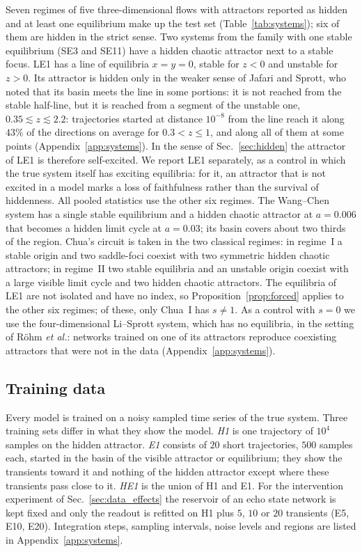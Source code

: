 \documentclass[aip,cha,reprint,amsmath,amssymb,longbibliography]{revtex4-2}
\theoremstyle{definition}
\begin{document}
Seven regimes of five three-dimensional flows with attractors reported as hidden and at least one equilibrium make up the
test set (Table~\ref{tab:systems}); six of them are hidden in the strict sense.\cite{Molaie2013,JafariSprott2013,WangChen2012,Leonov2011PLA,Stankevich2017} Two systems from
the family with one stable equilibrium (SE3 and SE11) have a hidden chaotic attractor next to a stable focus. LE1 has a line
of equilibria $x=y=0$, stable for $z<0$ and unstable for $z>0$. Its attractor is hidden only in the weaker sense of
Jafari and Sprott,\cite{JafariSprott2013} who noted that its basin meets the line in some portions: it is not reached from
the stable half-line, but it is reached from a segment of the unstable one, $0.35\lesssim z\lesssim2.2$: trajectories
started at distance $10^{-8}$ from the line reach it along $43\%$ of the directions on average for $0.3<z\le1$, and along
all of them at some points (Appendix~\ref{app:systems}).
In the sense of Sec.~\ref{sec:hidden} the attractor of LE1 is therefore self-excited. We report LE1 separately, as a
control in which the true system itself has exciting equilibria: for it, an attractor that is not excited in a model
marks a loss of faithfulness rather than the survival of hiddenness. All pooled statistics use the other six regimes.
The Wang--Chen system has a single stable equilibrium and a hidden chaotic attractor at
$a=0.006$ that becomes a hidden limit cycle at $a=0.03$; its basin covers about two thirds of the region. Chua's circuit is
taken in the two classical regimes: in regime~I a stable origin and two saddle-foci coexist with two symmetric hidden
chaotic attractors; in regime~II two stable equilibria and an unstable origin coexist with a large visible limit cycle
and two hidden chaotic attractors. The equilibria of LE1 are not isolated and have no index, so
Proposition~\ref{prop:forced} applies to the other six regimes; of these, only Chua~I has $s\neq1$. As a control with $s=0$ we
use the four-dimensional Li--Sprott system, which has no equilibria, in the setting of R\"ohm
\textit{et al.}:\cite{Rohm2021} networks trained on one of its attractors reproduce coexisting attractors that were not in
the data (Appendix~\ref{app:systems}).

\subsection{Training data}
\label{sec:data}

Every model is trained on a noisy sampled time series of the true system. Three training sets differ in what they show
the model. \emph{H1} is one trajectory of $10^4$ samples on the hidden attractor. \emph{E1} consists of $20$ short
trajectories, $500$ samples each, started in the basin of the visible attractor or equilibrium; they show the transients
toward it and nothing of the hidden attractor except where these transients pass close to it. \emph{HE1} is the union of
H1 and E1. For the intervention experiment of Sec.~\ref{sec:data_effects} the reservoir of an echo state network is kept
fixed and only the readout is refitted on H1 plus $5$, $10$ or $20$ transients (E5, E10, E20). Integration steps, sampling
intervals, noise levels and regions are listed in Appendix~\ref{app:systems}.
\end{document}
